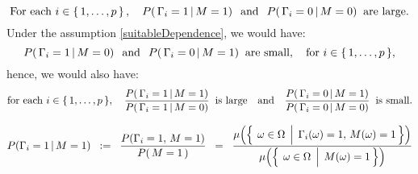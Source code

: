 
\begin{equation}
\textnormal{For each $i \in\left\{\,1,\ldots,p\,\right\}$}\,,
\quad
P(\,\Gamma_{i}=1\,\vert\,M = 1)\;\;\,\textnormal{and}\;\;\,P(\,\Gamma_{i}=0\,\vert\,M = 0)\;\;\textnormal{are large}.
\end{equation}
Under the assumption \eqref{suitableDependence}, we would have:
\begin{equation*}
P(\,\Gamma_{i}=1\,\vert\,M = 0)\;\;\,\textnormal{and}\;\;\,P(\,\Gamma_{i}=0\,\vert\,M = 1)\;\;\textnormal{are small},
\quad
\textnormal{for $i \in\left\{\,1,\ldots,p\,\right\}$},
\end{equation*}
hence, we would also have:
\begin{equation*}
\textnormal{for each $i \in\left\{\,1,\ldots,p\,\right\}$},
\quad
\dfrac{P(\,\Gamma_{i}=1\,\vert\,M = 1)}{P(\,\Gamma_{i}=1\,\vert\,M = 0)}\;\;\textnormal{is large}
\quad\textnormal{and}\quad
\dfrac{P(\,\Gamma_{i}=0\,\vert\,M = 1)}{P(\,\Gamma_{i}=0\,\vert\,M = 0)}\;\;\textnormal{is small}.
\end{equation*}

\begin{equation*}
P\!\left(\Gamma_{i}=1\,\vert\,M=1\right)
\;\; := \;\;
	\dfrac{P\!\left(\Gamma_{i}=1,\,M=1\right)}{P\!\left(\,M=1\,\right)}
\;\; = \;\;
	\dfrac{\mu\!\left(\left\{\;\left.\omega\overset{{\color{white}.}}{\in}\Omega\,\;\right\vert\;\Gamma_{i}(\omega)=1,\,M(\omega)=1\,\right\}\right)}
	{\mu\!\left(\left\{\;\left.\omega\overset{{\color{white}.}}{\in}\Omega\;\,\right\vert\;M(\omega)=1\,\right\}\right)}
\end{equation*}


\renewcommand{\theenumi}{\roman{enumi}}
\renewcommand{\labelenumi}{\textnormal{(\theenumi)}$\;\;$}

